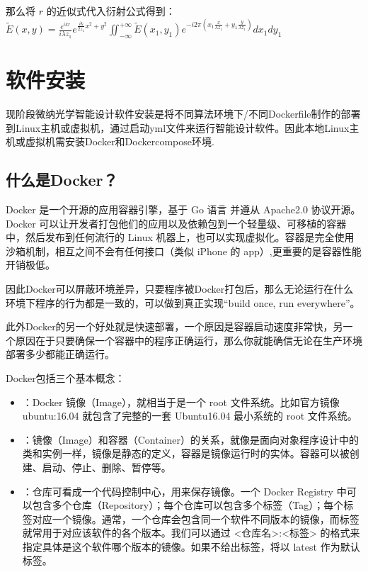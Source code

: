 \documentclass[letterpaper,10pt,english]{sphinxmanual}
\begin{document}
\sphinxAtStartPar
那么将 \(r\) 的近似式代入衍射公式得到：
\(\tilde{E}(x,y)=\frac{e^{ikr}}{i\lambda z_1}e^{\frac{ik}{2z_1}{x^2+y^2}}\iint_{-\infty}^{+\infty}{\tilde{E}(x_1,y_1)e^{-i2\pi(x_1\frac{x}{\lambda z_1}+y_1\frac{y}{\lambda z_1})}dx_1dy_1}\)

\sphinxstepscope


\chapter{软件安装}
\label{\detokenize{_u8f6f_u4ef6_u5b89_u88c5/index:id1}}\label{\detokenize{_u8f6f_u4ef6_u5b89_u88c5/index::doc}}
\sphinxAtStartPar
现阶段微纳光学智能设计软件安装是将不同算法环境下/不同Dockerfile制作的部署到Linux主机或虚拟机，通过启动yml文件来运行智能设计软件。因此本地Linux主机或虚拟机需安装Docker和Docker\sphinxhyphen{}compose环境.


\section{什么是Docker？}
\label{\detokenize{_u8f6f_u4ef6_u5b89_u88c5/index:docker}}
\sphinxAtStartPar
Docker 是一个开源的应用容器引擎，基于 Go 语言 并遵从 Apache2.0 协议开源。Docker 可以让开发者打包他们的应用以及依赖包到一个轻量级、可移植的容器中，然后发布到任何流行的 Linux 机器上，也可以实现虚拟化。容器是完全使用沙箱机制，相互之间不会有任何接口（类似 iPhone 的 app）,更重要的是容器性能开销极低。

\sphinxAtStartPar
因此Docker可以屏蔽环境差异，只要程序被Docker打包后，那么无论运行在什么环境下程序的行为都是一致的，可以做到真正实现“build once, run everywhere”。

\sphinxAtStartPar
此外Docker的另一个好处就是快速部署，一个原因是容器启动速度非常快，另一个原因在于只要确保一个容器中的程序正确运行，那么你就能确信无论在生产环境部署多少都能正确运行。

\sphinxAtStartPar
Docker包括三个基本概念：
\begin{itemize}
\item {} 
\sphinxAtStartPar
{}：Docker 镜像（Image），就相当于是一个 root 文件系统。比如官方镜像 ubuntu:16.04 就包含了完整的一套 Ubuntu16.04 最小系统的 root 文件系统。

\item {} 
\sphinxAtStartPar
{}：镜像（Image）和容器（Container）的关系，就像是面向对象程序设计中的类和实例一样，镜像是静态的定义，容器是镜像运行时的实体。容器可以被创建、启动、停止、删除、暂停等。

\item {} 
\sphinxAtStartPar
{}：仓库可看成一个代码控制中心，用来保存镜像。一个 Docker Registry 中可以包含多个仓库（Repository）；每个仓库可以包含多个标签（Tag）；每个标签对应一个镜像。通常，一个仓库会包含同一个软件不同版本的镜像，而标签就常用于对应该软件的各个版本。我们可以通过 \textless{}仓库名\textgreater{}:\textless{}标签\textgreater{} 的格式来指定具体是这个软件哪个版本的镜像。如果不给出标签，将以 latest 作为默认标签。

\end{itemize}
\end{document}
